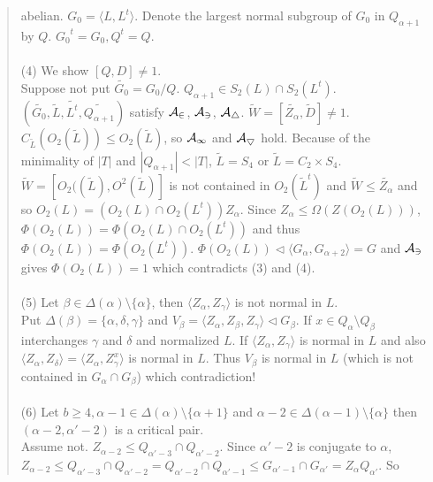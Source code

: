 \begin{quote}
abelian.
$G_0 = \langle L, L^t \rangle$.  Denote the largest normal subgroup of $G_0$ in $Q_{\alpha +1}$ by $Q$.
${G_0}^t=G_0, Q^t=Q$.  \\
\\
(4) We show $[Q, D] \ne 1$.\\
Suppose not put ${\tilde {G_0}} = G_0/Q$.
$Q_{\alpha + 1} \in S_2(L) \cap S_2(L^t)$.
$({\tilde {G_0}}, {\tilde L}, {\tilde {L^t}}, {\tilde {Q_{\alpha + 1}}})$ satisfy ${\cal {A_2}}$, ${\cal {A_3}}$, ${\cal {A_4}}$.
${\tilde W}= [{\tilde {Z_{\alpha}}}, {\tilde D}] \ne 1$.
$C_{\tilde L}(O_2({\tilde L})) \leq O_2({\tilde L})$, so  ${\cal {A_1}}$ and ${\cal {A_5}}$ hold.
Because of the minimality of $|T|$ and $|Q_{\alpha + 1}| < |T|$, ${\tilde L} = S_4$ or ${\tilde L} = C_2 \times S_4$.
${\tilde W} = [O_2(({\tilde L}), O^2({\tilde L})]$ is not contained in $O_2({\tilde L}^t)$ and ${\tilde W} \leq {\tilde {Z_{\alpha}}}$
and so $O_2(L) =(O_2(L) \cap O_2(L^t))Z_{\alpha}$.
Since $Z_{\alpha} \leq \Omega(Z(O_2(L)))$, $\Phi(O_2(L))= \Phi(O_2(L) \cap O_2(L^t))$ and thus
$\Phi(O_2(L)) = \Phi(O_2(L^t))$. $\Phi(O_2(L)) \lhd \langle G_{\alpha}, G_{\alpha + 2} \rangle = G$ and ${\cal {A_3}}$ gives
$\Phi(O_2(L))=1$ which contradicts (3) and (4).\\
\\
(5) Let $\beta \in \Delta(\alpha) \setminus \{\alpha \}$, then $\langle Z_{\alpha}, Z_{\gamma} \rangle$ is not normal in $L$.
\\
Put $\Delta(\beta) = \{ \alpha, \delta, \gamma \}$ and $V_{\beta}= \langle Z_{\alpha}, Z_{\beta}, Z_{\gamma} \rangle \lhd G_{\beta}$.
If $x \in Q_{\alpha} \setminus Q_{\beta}$ interchanges $\gamma$ and $\delta$ and normalized $L$.
If $\langle Z_{\alpha} , Z_{\gamma} \rangle$ is normal in $L$ and also $\langle Z_{\alpha}, Z_{\delta} \rangle = \langle Z_{\alpha}, Z_{\gamma}^x \rangle$ is normal in $L$.  Thus $V_{\beta}$ is normal
in $L$ (which is not contained in $G_{\alpha} \cap G_{\beta}$) which contradiction!\\
\\
(6) Let $b \geq 4, \alpha - 1 \in \Delta(\alpha) \setminus \{ \alpha + 1 \}$ and
$\alpha - 2 \in \Delta(\alpha - 1) \setminus \{\alpha \}$ then $(\alpha - 2, \alpha' - 2)$ is a critical pair.
\\
Assume not.  $Z_{\alpha - 2} \leq Q_{\alpha' - 3} \cap Q_{\alpha' - 2}$.  Since
$\alpha' - 2$ is conjugate to $\alpha$,
$Z_{\alpha -2} \leq Q_{\alpha' -3} \cap Q_{\alpha' - 2} = Q_{\alpha' - 2} \cap Q_{\alpha' - 1} \leq
G_{\alpha' - 1} \cap G_{\alpha'} = Z_{\alpha}Q_{\alpha'}$.  So

\end{quote}

